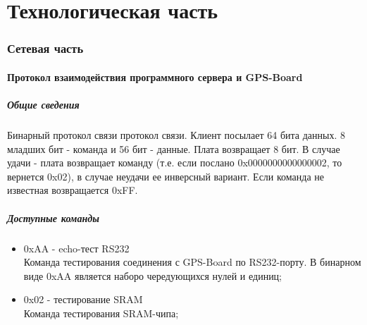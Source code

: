 \part{Технологическая часть}

\section{Сетевая часть}


\subsection{Протокол взаимодействия программного сервера и GPS-Board}
\subsubsection{Общие сведения}
Бинарный протокол связи протокол связи. Клиент посылает 64 бита данных. 8 младших бит - команда и 56 бит - данные. Плата возвращает 8 бит. В случае
удачи - плата возвращает команду (т.е. если послано 0x0000000000000002, то вернется 0x02), в случае неудачи ее инверсный вариант. Если команда не известная
возвращается 0xFF.

\subsubsection{Доступные команды}
\begin{itemize}
\item 0xAA - echo-тест RS232 \\
Команда тестирования соединения с GPS-Board по RS232-порту. В бинарном виде 0xAA является наборо чередующихся нулей и единиц;
\item 0x02 - тестирование SRAM \\ 
Команда тестирования SRAM-чипа;
\end{itemize}

